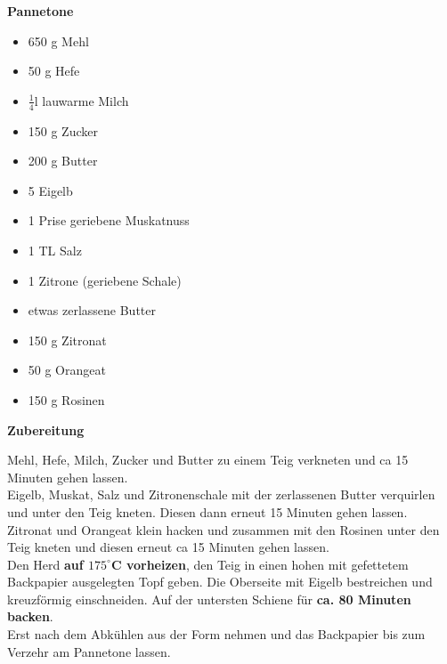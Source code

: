 

\parindent0pt	

\pagestyle{empty}


\textbf{{\LARGE Pannetone}}%


\hrulefill
\vspace*{\fill}
\begin{multicols}{2}	


\begin{itemize}
\item 650 g Mehl
\item 50 g Hefe
\item $\frac{1}{4}$l lauwarme Milch
\item 150 g Zucker
\item 200 g Butter

\item 5 Eigelb
\item 1 Prise geriebene Muskatnuss
\item 1 TL Salz
\item 1 Zitrone (geriebene Schale)
\item etwas zerlassene Butter

\item 150 g Zitronat
\item 50 g Orangeat
\item 150 g Rosinen
\end{itemize}

\end{multicols}
\vfill
\newpage
\textbf{{\LARGE Zubereitung}}%

\hrulefill

\vspace*{\fill}
\begin{multicols}{2}


Mehl, Hefe, Milch, Zucker und Butter zu einem Teig verkneten und ca 15 Minuten gehen lassen.\\

Eigelb, Muskat, Salz und Zitronenschale mit der zerlassenen Butter verquirlen und unter den Teig kneten. 
Diesen dann erneut 15 Minuten gehen lassen.\\

Zitronat und Orangeat klein hacken und zusammen mit den Rosinen unter den Teig kneten und 
diesen erneut ca 15 Minuten gehen lassen.\\

Den Herd \textbf{auf $175^\circ$C vorheizen}, den Teig in einen hohen mit gefettetem Backpapier ausgelegten Topf
geben. Die Oberseite mit Eigelb bestreichen und kreuzförmig einschneiden. 
Auf der untersten Schiene für \textbf{ca. 80 Minuten backen}.\\

Erst nach dem Abkühlen aus der Form nehmen und das Backpapier bis zum Verzehr am Pannetone lassen.



\end{multicols}
\vfill
